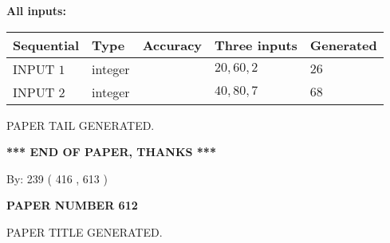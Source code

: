 \documentclass[12pt]{article}
\begin{document}
   
   
   
\noindent\vspace{0.1in}\hspace{-0.08in} {\textbf{\Large{All inputs: }}}
   
   
  
  
\noindent\begin{tabular}{|l|l|l|l|l|}
\hline
 Sequential & Type & Accuracy & Three inputs & Generated \\ 
\hline
 
 
  INPUT $  1 $ & integer &  & $
 20
 , 
 60
 , 
 2
 $ & $ 26 $ 
 \\  \hline  
 
 
  INPUT $  2 $ & integer &  & $
 40
 , 
 80
 , 
 7
 $ & $ 68 $ 
 \\  \hline  
 \end{tabular}
   
   
   
   
   
   
 \vspace{0.2in}
 
   
   
\vspace{2.0in} PAPER TAIL GENERATED.
   
   
   
   
\vspace{1.0in} 
{\textbf{\large{ *** END OF PAPER, THANKS *** }}} 
   
   
\hspace{1.0in} By: 
 239 ( 416 ,  613 )
   
   
   
   
\newpage 
\setcounter{page}{ 
   612001 } 
   
   
   
   
 {\textbf{ \Large{ PAPER NUMBER  612  }}}
   
   
\vspace{0.2in}
   
   
   
   
   
   
   
   
 \vspace{0.2in}
 
 
 
 
   
   
 PAPER TITLE GENERATED.
   
   
   
\vspace{0.2in}
   
\end{document}
